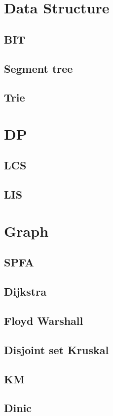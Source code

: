 \section{Data Structure}
        \subsection{BIT}
                
        \subsection{Segment tree}
                
        \subsection{Trie}
                

\section{DP}
        \subsection{LCS}
                
        \subsection{LIS}
                  

\section{Graph}
        \subsection{SPFA}
                
        \subsection{Dijkstra}
                
        \subsection{Floyd Warshall}
                
        \subsection{Disjoint set Kruskal}
                
        \subsection{KM}
                
        \subsection{Dinic}
                